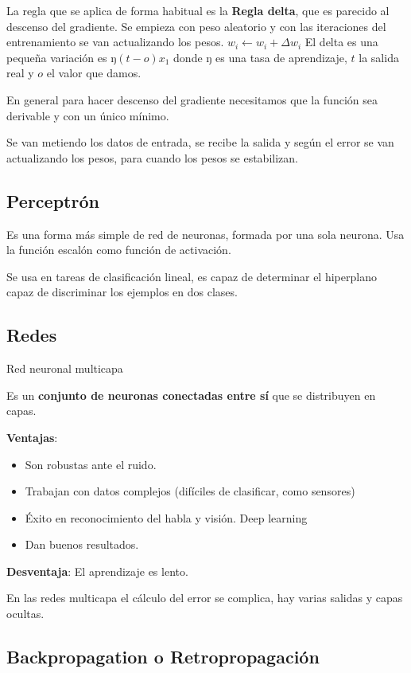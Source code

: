 \documentclass[12pt, twoside, openright]{report} %
\begin{document}
La regla que se aplica de forma habitual es la \textbf{Regla delta}, que
es parecido al descenso del gradiente. Se empieza con peso aleatorio y
con las iteraciones del entrenamiento se van actualizando los pesos.
\(w_i \leftarrow w_i+\Delta w_i\) El delta es una pequeña variación es
ŋ\((t-o)x_1\) donde ŋ es una tasa de aprendizaje, \(t\) la salida real y
\(o\) el valor que damos.

En general para hacer descenso del gradiente necesitamos que la función
sea derivable y con un único mínimo.

Se van metiendo los datos de entrada, se recibe la salida y según el error se van actualizando los pesos, para cuando los pesos se estabilizan.

\subsection{Perceptrón}

Es una forma más simple de red de neuronas, formada por una sola
neurona. Usa la función escalón como función de activación.

Se usa en tareas de clasificación lineal, es capaz de determinar el hiperplano capaz de discriminar los ejemplos en dos clases.

\subsection{Redes}

Red neuronal multicapa

Es un \textbf{conjunto de neuronas conectadas entre sí} que se distribuyen en capas.

\textbf{Ventajas}:
\vspace{-.5cm}
\begin{itemize}
	\item Son robustas ante el ruido.
	\item Trabajan con datos complejos (difíciles de clasificar, como sensores)
	\item Éxito en reconocimiento del habla y visión. Deep learning
	\item Dan buenos resultados.
\end{itemize}

\textbf{Desventaja}: El aprendizaje es lento.

En las redes multicapa el cálculo del error se complica, hay varias
salidas y capas ocultas.

\subsection{Backpropagation o Retropropagación}
\end{document}
